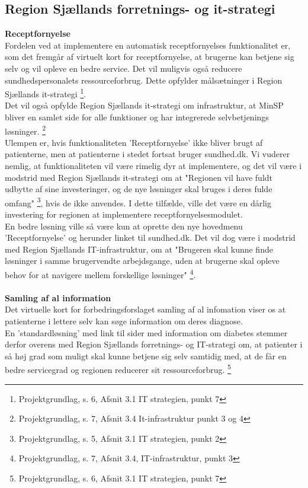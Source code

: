 \subsection{Region Sjællands forretnings- og it-strategi}
\textbf{Receptfornyelse}\\
Fordelen ved at implementere en automatisk receptfornyelses funktionalitet er, som det fremgår af virtuelt kort for receptfornyelse, at brugerne kan betjene sig selv og vil opleve en bedre service. Det vil muligvis også reducere sundhedspersonalets ressourceforbrug. Dette opfylder målsætninger i Region Sjællands it-strategi \footnote{Projektgrundlag, s. 6, Afsnit 3.1 IT strategien, punkt 7 }.\\
Det vil også opfylde Region Sjællands it-strategi om infrastruktur, at MinSP bliver en samlet side for alle funktioner og har integrerede selvbetjenings løsninger. \footnote{Projektgrundlag, s. 7, Afsnit 3.4 It-infrastruktur punkt 3 og 4}\\
Ulempen er, hvis funktionaliteten 'Receptfornyelse' ikke bliver brugt af patienterne, men at patienterne i stedet fortsat bruger sundhed.dk. Vi vuderer nemlig, at funktionaliteten vil være rimelig dyr at implementere, og det vil være i modstrid med Region Sjællands it-strategi om at "Regionen vil have fuldt udbytte af sine investeringer, og de nye løsninger skal bruges i deres fulde omfang" \footnote{Projektgrundlag, s. 5, Afsnit 3.1 IT strategien, punkt 2}, hvis de ikke anvendes. I dette tilfælde, ville det være en dårlig investering for regionen at implementere receptfornyelsesmodulet.\\ 
En bedre løsning ville så være kun at oprette den nye hovedmenu 'Receptfornyelse' og herunder linket til sundhed.dk. Det vil dog være i modstrid med Region Sjællands IT-infrastruktur, om at "Brugeren skal kunne finde løsninger i samme brugervendte arbejdsgange, uden at brugerne skal opleve behov for at navigere mellem forskellige løsninger" \footnote{Projektgrundlag, s. 7, Afsnit 3.4, IT-infrastruktur, punkt 3}. 
\\\\
\textbf{Samling af al information}\\
Det virtuelle kort for forbedringsforslaget samling af al infomation viser os at patienterne i lettere selv kan søge information om deres diagnose.\\
En 'standardløsning' med link til sider med information om diabetes stemmer derfor overens med Region Sjællands forretnings- og IT-strategi om, at patienter i så høj grad som muligt skal kunne betjene sig selv samtidig med, at de får en bedre servicegrad og regionen reducerer sit ressourceforbrug. \footnote{Projektgrundlag, s. 6, Afsnit 3.1 IT strategien, punkt 7} \\
